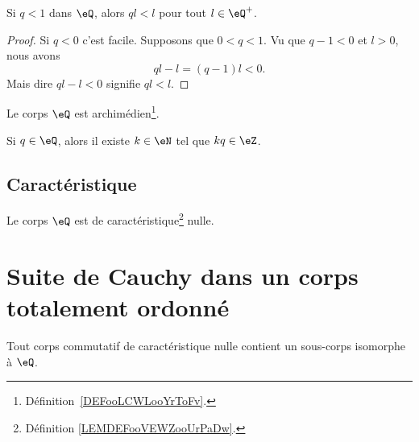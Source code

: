 \begin{proposition}     \label{PROPooBTCCooVVvaeL}
	Si \( q<1\) dans \( \eQ\), alors \( ql<l\) pour tout \( l\in \eQ^+\).
\end{proposition}

\begin{proof}
	Si \( q<0\) c'est facile. Supposons que \( 0<q<1\). Vu que \( q-1<0\) et \( l>0\), nous avons
	\begin{equation}
		ql-l=(q-1)l<0.
	\end{equation}
	Mais dire \( ql-l<0\) signifie \( ql<l\).
\end{proof}

\begin{proposition}     \label{PROPooMXGPooDUkOuv}
	Le corps \( \eQ\) est archimédien\footnote{Définition~\ref{DEFooLCWLooYrToFv}.}.
\end{proposition}

\begin{lemma}		\label{LEMooMUYAooDLgDcf}
	Si \( q\in \eQ\), alors il existe \( k\in \eN\) tel que \( kq\in \eZ\).
\end{lemma}

\subsection{Caractéristique}

\begin{lemma}       \label{LEMooYCPUooNxEPhB}
	Le corps \( \eQ\) est de caractéristique\footnote{Définition \ref{LEMDEFooVEWZooUrPaDw}.} nulle.
\end{lemma}

\section{Suite de Cauchy dans un corps totalement ordonné}


\begin{lemma}        \label{LEMooLTBIooSZnvsQ}
	Tout corps commutatif de caractéristique nulle contient un sous-corps isomorphe à \( \eQ\).
\end{lemma}

